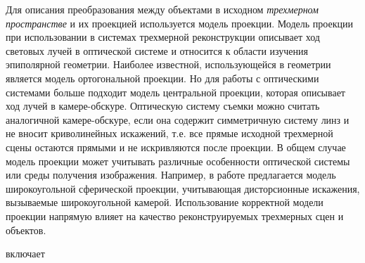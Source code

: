 Для описания преобразования между объектами в исходном \textit{трехмерном пространстве} и их проекцией используется модель проекции. Модель проекции при использовании в системах трехмерной реконструкции описывает ход световых лучей в оптической системе и относится к области изучения эпиполярной геометрии. Наиболее известной, использующейся в геометрии является модель ортогональной проекции. Но для работы с оптическими системами больше подходит модель центральной проекции, которая описывает ход лучей в камере-обскуре.  Оптическую систему съемки можно считать аналогичной камере-обскуре, если она содержит симметричную систему линз и не вносит криволинейных искажений, т.е. все прямые исходной трехмерной сцены остаются прямыми и не искривляются после проекции. В общем случае модель проекции может учитывать различные особенности оптической системы или среды получения изображения. Например, в работе  предлагается модель широкоугольной сферической проекции, учитывающая дисторсионные искажения, вызываемые широкоугольной камерой. Использование корректной модели проекции напрямую влияет на качество реконструируемых трехмерных сцен и объектов.

\begin{SCn}
\end{SCn}

\begin{SCn}
    \begin{scnrelfromset}{включает}
        \begin{scnindent}    
        \end{scnindent}
    \end{scnrelfromset}
\end{SCn}

